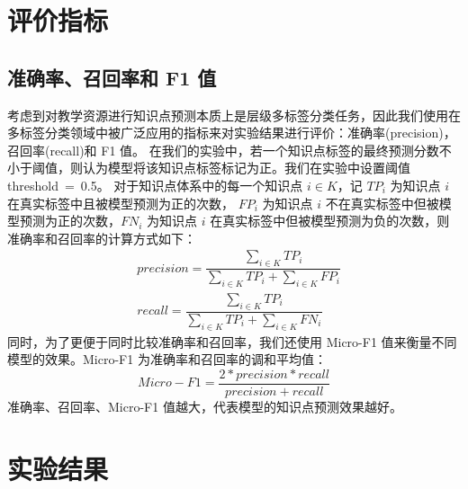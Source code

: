 \section{评价指标}
    \subsection{准确率、召回率和 F1 值}
    考虑到对教学资源进行知识点预测本质上是层级多标签分类任务，因此我们使用在多标签分类领域中被广泛应用的指标来对实验结果进行评价：准确率(precision)，召回率(recall)和 F1 值。
    在我们的实验中，若一个知识点标签的最终预测分数不小于阈值，则认为模型将该知识点标签标记为正。我们在实验中设置阈值 threshold\ =\ 0.5。
    对于知识点体系中的每一个知识点 $i \in K$，记 $TP_i$ 为知识点 $i$ 在真实标签中且被模型预测为正的次数，
    $FP_i$ 为知识点 $i$ 不在真实标签中但被模型预测为正的次数，$FN_i$ 为知识点 $i$ 在真实标签中但被模型预测为负的次数，则准确率和召回率的计算方式如下：
    \begin{equation}
        \begin{aligned}
            &precision = \dfrac{\sum_{i \in K}TP_i}{\sum_{i \in K}TP_i + \sum_{i \in K}FP_i} \\
            &recall = \dfrac{\sum_{i \in K}TP_i}{\sum_{i \in K}TP_i + \sum_{i \in K}FN_i}
        \end{aligned}
    \end{equation}
    同时，为了更便于同时比较准确率和召回率，我们还使用 Micro-F1 值来衡量不同模型的效果。Micro-F1 为准确率和召回率的调和平均值：
    \begin{equation}
        Micro-F1 = \dfrac{2 * precision * recall}{precision + recall}
    \end{equation}
    准确率、召回率、Micro-F1 值越大，代表模型的知识点预测效果越好。


\section{实验结果}
